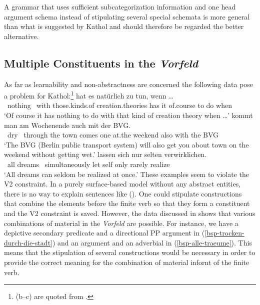 A grammar that uses sufficient subcategorization information and one head argument schema 
instead of stipulating several special sche\-ma\-ta is more general than what is suggested by Kathol and
should therefore be regarded the better alternative.



\subsection{Multiple Constituents in the \emph{Vorfeld}}

As far as learnability and non-abstractness are concerned the following data
pose a problem for Kathol:\footnote{
  (b--c) are quoted from .%
}
\eal
\ex
{} hat es natürlich zu tun, wenn \ldots\footnotemark\\
     ~nothing ~with those.kinds.of creation.theories    has it of.course  to do   when\\
\glt `Of course it has nothing to do with that kind of creation theory when \ldots'%
\label{bsp-nichts-mit-derartigen}
\ex 
{} kommt man am     Wochenende auch mit  der BVG.\footnotemark\\
     ~dry      ~through the town   comes one at.the weekend    also with the BVG\\
\label{bsp-trocken-durch-die-stadt}
\glt `The BVG (Berlin public transport system) will also get you about town on the weekend without getting wet.'%
\ex\label{bsp-alle-traeume}
  lassen sich nur  selten verwirklichen.\footnotemark\\
     ~all  dreams   ~simultaneously let   self only rarely realize\\
\glt `All dreams can seldom be realized at once.'
\zl
These examples seem to violate the V2 constraint. In a purely surface-based model without
any abstract entities, there is no way to explain sentences like (). One could stipulate
constructions that combine the elements before the finite verb so that they form a constituent and
the V2 constraint is saved. However, the data discussed in \citealp{Mueller2003b} shows that various 
combinations of material in the \emph{Vorfeld} are possible. For instance, we have a depictive
secondary predicate and a directional PP argument in (\ref{bsp-trocken-durch-die-stadt}) and
an argument and an adverbial in (\ref{bsp-alle-traeume}).
This means that the stipulation of several
constructions would be necessary in order to provide the correct meaning for the combination
of material infornt of the finite verb. 

